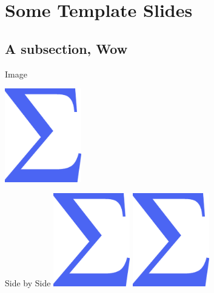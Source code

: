 \documentclass[aspectratio=169]{beamer}
\begin{document}
\section{Some Template Slides}
\frame{\sectionpage}

\subsection{A subsection, Wow}
\frame{\subsectionpage}

\begin{frame}{Image}
  \begin{center}
    \includegraphics[width=0.25\textwidth]{images/sigma.png}
  \end{center}
\end{frame}

\begin{frame}{Side by Side}
    \includegraphics[width=0.25\textwidth]{images/sigma.png}\hspace{0.4\textwidth}
    \includegraphics[width=0.25\textwidth]{images/sigma.png}
\end{frame}
\end{document}
